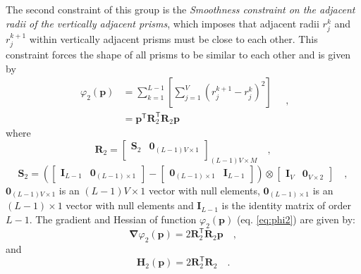 The second constraint of this group is the \textit{Smoothness constraint on the adjacent radii of the 
vertically adjacent prisms}, which imposes that adjacent radii $r_{j}^{k}$ and $r_{j}^{k+1}$ within vertically 
adjacent prisms must be close to each other. This constraint forces the shape of all prisms to be similar to each other
and is given by
\begin{equation}\label{eq:phi2}
\begin{split}
\varphi_{2}(\mathbf{p}) &= \sum\limits^{L-1}_{k=1}\left[\sum\limits^{V}_{j=1}\left(r^{k+1}_{j}-r^{k}_{j}\right)^2\right] \\
&= \mathbf{p}^{\mathsf{T}} \mathbf{R}^{\mathsf{T}}_{2}\mathbf{R}_{2}\mathbf{p}
\end{split} \quad ,
\end{equation}
where 
\begin{equation}
\mathbf{R}_{2} = 
\begin{bmatrix}
\mathbf{S}_{2} & \mathbf{0}_{(L-1)V \times 1} \\
\end{bmatrix}_{(L-1)V \times M} \quad ,
\label{eq:R2-matrix}
\end{equation}
\begin{equation}
\mathbf{S}_{2} =
\left( 
\begin{bmatrix} \mathbf{I}_{L-1} & \mathbf{0}_{(L-1) \times 1} \end{bmatrix} -
\begin{bmatrix} \mathbf{0}_{(L-1) \times 1} & \mathbf{I}_{L-1} \end{bmatrix} 
\right) \otimes 
\begin{bmatrix} \mathbf{I}_{V} & \mathbf{0}_{V \times 2} \end{bmatrix} \quad ,
\label{eq:S2-matrix}
\end{equation}
$\mathbf{0}_{(L-1)V \times 1}$ is an $(L-1)V \times 1$ vector with null elements,
$\mathbf{0}_{(L-1) \times 1}$ is an $(L-1) \times 1$ vector with null elements and 
$\mathbf{I}_{L-1}$ is the identity matrix of order $L-1$. The gradient and Hessian of function $\varphi_{2}(\mathbf{p})$ (eq. \ref{eq:phi2}) are given by:
\begin{equation}\label{eq:phi2_grad}
\boldsymbol{\nabla}\varphi_{2}(\mathbf{p}) = 2\mathbf{R}^\mathsf{T}_{2}\mathbf{R}_{2}\mathbf{p} \quad ,
\end{equation}
and
\begin{equation}\label{eq:phi2_hessian}
\mathbf{H}_{2}(\mathbf{p}) = 2\mathbf{R}^\mathsf{T}_{2}\mathbf{R}_{2} \quad .
\end{equation}

